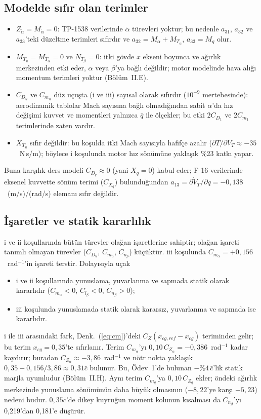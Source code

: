 \documentclass[conf]{new-aiaa}
\begin{document}
\subsection{Modelde sıfır olan terimler}
\begin{itemize}
\item $Z_{\dot\alpha}=M_{\dot\alpha}=0$: TP-1538 verilerinde $\dot\alpha$ türevleri yoktur; bu nedenle $a_{31}$, $a_{32}$ ve $a_{33}$'teki düzeltme terimleri sıfırdır ve $a_{32}=M_\alpha+M_{T_\alpha}$, $a_{33}=M_q$ olur.
\item $M_{T_u}=M_{T_\alpha}=0$ ve $N_{T_\beta}=0$: itki gövde $x$ ekseni boyunca ve ağırlık merkezinden etki eder, $\alpha$ veya $\beta$'ya bağlı değildir; motor modelinde hava alığı momentum terimleri yoktur (Bölüm~II.E).
\item $C_{D_u}$ ve $C_{m_u}$ düz uçuşta (i ve iii) sayısal olarak sıfırdır ($10^{-9}$ mertebesinde): aerodinamik tablolar Mach sayısına bağlı olmadığından sabit $\alpha$'da hız değişimi kuvvet ve momentleri yalnızca $\bar q$ ile ölçekler; bu etki $2C_{D_1}$ ve $2C_{m_1}$ terimlerinde zaten vardır.
\item $X_{T_u}$ sıfır değildir: bu koşulda itki Mach sayısıyla hafifçe azalır ($\partial T/\partial V_T\approx-35$~N\,s/m); böylece i koşulunda motor hız sönümüne yaklaşık \%23 katkı yapar.
\end{itemize}
Buna karşılık ders modeli $C_{D_q}\approx0$ (yani $X_q=0$) kabul eder; F-16 verilerinde eksenel kuvvette sönüm terimi ($C_{X_q}$) bulunduğundan $a_{13}=\partial\dot V_T/\partial q=-0,138$~(m/s)/(rad/s) elemanı sıfır değildir.

\subsection{İşaretler ve statik kararlılık}
i ve ii koşullarında bütün türevler olağan işaretlerine sahiptir; olağan işareti tanımlı olmayan türevler ($C_{D_u}$, $C_{m_u}$, $C_{n_p}$) küçüktür. iii koşulunda $C_{m_\alpha}=+0,156$~rad$^{-1}$'in işareti terstir. Dolayısıyla uçak
\begin{itemize}
\item i ve ii koşullarında yunuslama, yuvarlanma ve sapmada statik olarak kararlıdır ($C_{m_\alpha}<0$, $C_{l_\beta}<0$, $C_{n_\beta}>0$);
\item iii koşulunda yunuslamada statik olarak kararsız, yuvarlanma ve sapmada ise kararlıdır.
\end{itemize}
i ile iii arasındaki fark, Denk.~(\ref{eq:cm})'deki $C_Z(x_{cg,ref}-x_{cg})$ teriminden gelir; bu terim $x_{cg}=0,35$'te sıfırlanır. Terim $C_{m_\alpha}$'yı $0,10\,C_{Z_\alpha}=-0,386$~rad$^{-1}$ kadar kaydırır; buradan $C_{Z_\alpha}\approx-3,86$~rad$^{-1}$ ve nötr nokta yaklaşık $0,35-0,156/3,86\approx0,31\bar c$ bulunur. Bu, Ödev~1'de bulunan $-\%4\,\bar c$'lik statik marjla uyumludur (Bölüm~II.H). Aynı terim $C_{m_q}$'ya $0,10\,C_{Z_q}$ ekler; öndeki ağırlık merkezinde yunuslama sönümünün daha büyük olmasının ($-8,22$'ye karşı $-5,23$) nedeni budur. $0,35\bar c$'de dikey kuyruğun moment kolunun kısalması da $C_{n_\beta}$'yı 0,219'dan 0,181'e düşürür.
\end{document}
